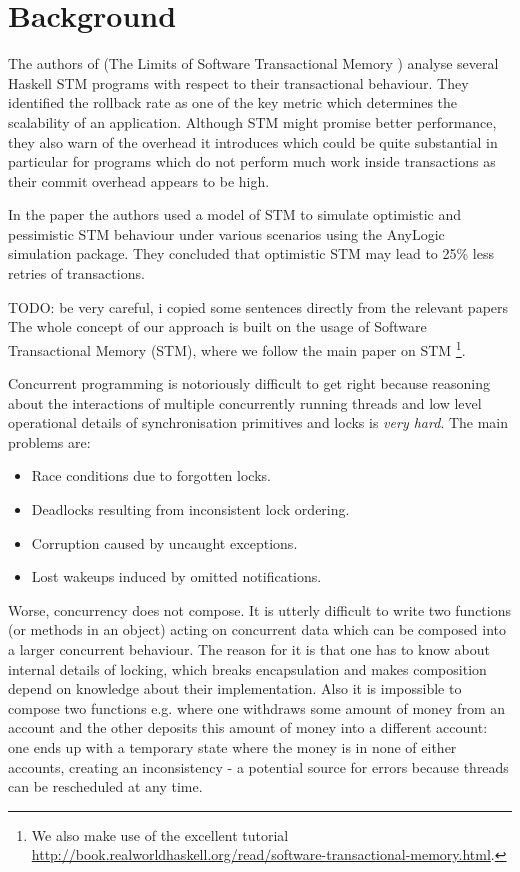 \section{Background }
\label{sec:background}

The authors of \cite{perfumo_limits_2008} (The Limits of Software Transactional Memory ) analyse several Haskell STM programs with respect to their transactional behaviour. They identified the rollback rate as one of the key metric which determines the scalability of an application. Although STM might promise better performance, they also warn of the overhead it introduces which could be quite substantial in particular for programs which do not perform much work inside transactions as their commit overhead appears to be high.
 
 In the paper \cite{heindl_modeling_2009} the authors used a model of STM to simulate optimistic and pessimistic STM behaviour under various scenarios using the AnyLogic simulation package. They concluded that optimistic STM may lead to 25\% less retries of transactions.


TODO: be very careful, i copied some sentences directly from the relevant papers
The whole concept of our approach is built on the usage of Software Transactional Memory (STM), where we follow the main paper \cite{harris_composable_2005, harris_transactional_2006} on STM \footnote{We also make use of the excellent tutorial \url{http://book.realworldhaskell.org/read/software-transactional-memory.html}.}. 

Concurrent programming is notoriously difficult to get right because reasoning about the interactions of multiple concurrently running threads and low level operational details of synchronisation primitives and locks is \textit{very hard}. The main problems are:

\begin{itemize}
	\item Race conditions due to forgotten locks.
	\item Deadlocks resulting from inconsistent lock ordering.
	\item Corruption caused by uncaught exceptions.
	\item Lost wakeups induced by omitted notifications.
\end{itemize}

Worse, concurrency does not compose. It is utterly difficult to write two functions (or methods in an object) acting on concurrent data which can be composed into a larger concurrent behaviour. The reason for it is that one has to know about internal details of locking, which breaks encapsulation and makes composition depend on knowledge about their implementation. Also it is impossible to compose two functions e.g. where one withdraws some amount of money from an account and the other deposits this amount of money into a different account: one ends up with a temporary state where the money is in none of either accounts, creating an inconsistency - a potential source for errors because threads can be rescheduled at any time.

